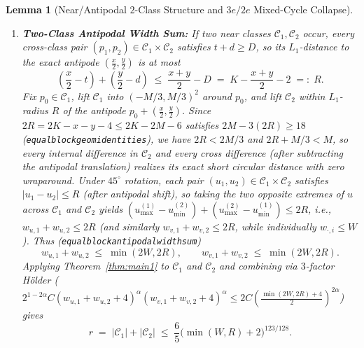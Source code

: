 \documentclass[11pt,reqno]{amsart}
\theoremstyle{plain}
\newtheorem{lemma}[theorem]{Lemma}
\theoremstyle{definition}
\theoremstyle{remark}
\DeclareRobustCommand{\_}{\ifmmode\text{\textunderscore}\else\textunderscore\allowbreak\fi}
\begin{document}
\begin{lemma}[Near/Antipodal $2$-Class Structure and $3e/2e$ Mixed-Cycle Collapse]
\begin{enumerate}[label=(\roman*),leftmargin=2.2em]
  \begin{equation}\label{eq:one-class}
    (w_u + 2)(w_v + 2) \;\le\; P \;:=\; \max\!\Bigl(\bigl(\min(W, 3e) + 2\bigr)^2,\; (W + 2)\bigl(\min(W, 2e) + 2\bigr)\Bigr).
  \end{equation}
  \item \textbf{Two-Class Antipodal Width Sum:} If two near classes $\mathcal{C}_1, \mathcal{C}_2$ occur, every cross-class pair $(p_1, p_2) \in \mathcal{C}_1 \times \mathcal{C}_2$ satisfies $t + d \ge D$, so its $L_1$-distance to the exact antipode $(\frac{x}{2}, \frac{y}{2})$ is at most
  \[
    \left(\frac{x}{2} - t\right) + \left(\frac{y}{2} - d\right) \;\le\; \frac{x + y}{2} - D \;=\; K - \frac{x + y}{2} - 2 \;=:\; R.
  \]
  Fix $p_0 \in \mathcal{C}_1$, lift $\mathcal{C}_1$ into $(-M/3, M/3)^2$ around $p_0$, and lift $\mathcal{C}_2$ within $L_1$-radius $R$ of the antipode $p_0 + (\frac{x}{2}, \frac{y}{2})$. Since $2R = 2K - x - y - 4 \le 2K - 2M - 6$ satisfies $2M - 3(2R) \ge 18$ (\texttt{equal\_block\_geom\_identities}), we have $2R < 2M/3$ and $2R + M/3 < M$, so every internal difference in $\mathcal{C}_2$ and every cross difference (after subtracting the antipodal translation) realizes its exact short circular distance with zero wraparound. Under $45^\circ$ rotation, each pair $(u_1, u_2) \in \mathcal{C}_1 \times \mathcal{C}_2$ satisfies $|u_1 - u_2| \le R$ (after antipodal shift), so taking the two opposite extremes of $u$ across $\mathcal{C}_1$ and $\mathcal{C}_2$ yields $(u_{\max}^{(1)} - u_{\min}^{(2)}) + (u_{\max}^{(2)} - u_{\min}^{(1)}) \le 2R$, i.e., $w_{u, 1} + w_{u, 2} \le 2R$ (and similarly $w_{v, 1} + w_{v, 2} \le 2R$, while individually $w_{\cdot, i} \le W$). Thus (\texttt{equal\_block\_antipodal\_width\_sum})
  \[
    w_{u, 1} + w_{u, 2} \;\le\; \min(2W, 2R), \qquad w_{v, 1} + w_{v, 2} \;\le\; \min(2W, 2R).
  \]
  Applying Theorem~\ref{thm:main1} to $\mathcal{C}_1$ and $\mathcal{C}_2$ and combining via $3$-factor H\"older ($2^{1 - 2\alpha} C (w_{u,1} + w_{u,2} + 4)^\alpha (w_{v,1} + w_{v,2} + 4)^\alpha \le 2 C (\frac{\min(2W, 2R) + 4}{2})^{2\alpha}$) gives
  \begin{equation}\label{eq:two-class}
    r \;=\; |\mathcal{C}_1| + |\mathcal{C}_2| \;\le\; \frac{6}{5}\bigl(\min(W, R) + 2\bigr)^{123/128}.
  \end{equation}
\end{enumerate}
\end{lemma}
\end{document}
